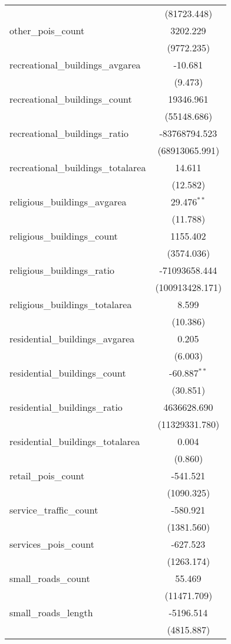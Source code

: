 \begin{table}[!htbp]
\begin{tabular}{@{\extracolsep{5pt}}lc}
  & (81723.448) \\
 other_pois_count & 3202.229$^{}$ \\
  & (9772.235) \\
 recreational_buildings_avgarea & -10.681$^{}$ \\
  & (9.473) \\
 recreational_buildings_count & 19346.961$^{}$ \\
  & (55148.686) \\
 recreational_buildings_ratio & -83768794.523$^{}$ \\
  & (68913065.991) \\
 recreational_buildings_totalarea & 14.611$^{}$ \\
  & (12.582) \\
 religious_buildings_avgarea & 29.476$^{**}$ \\
  & (11.788) \\
 religious_buildings_count & 1155.402$^{}$ \\
  & (3574.036) \\
 religious_buildings_ratio & -71093658.444$^{}$ \\
  & (100913428.171) \\
 religious_buildings_totalarea & 8.599$^{}$ \\
  & (10.386) \\
 residential_buildings_avgarea & 0.205$^{}$ \\
  & (6.003) \\
 residential_buildings_count & -60.887$^{**}$ \\
  & (30.851) \\
 residential_buildings_ratio & 4636628.690$^{}$ \\
  & (11329331.780) \\
 residential_buildings_totalarea & 0.004$^{}$ \\
  & (0.860) \\
 retail_pois_count & -541.521$^{}$ \\
  & (1090.325) \\
 service_traffic_count & -580.921$^{}$ \\
  & (1381.560) \\
 services_pois_count & -627.523$^{}$ \\
  & (1263.174) \\
 small_roads_count & 55.469$^{}$ \\
  & (11471.709) \\
 small_roads_length & -5196.514$^{}$ \\
  & (4815.887) \\

\end{tabular}
\end{table}
